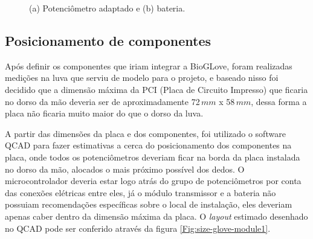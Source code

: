 \documentclass[
	12pt,				%
	openright,			%
	oneside,			%
	a4paper,			%
	english,			%
	brazil				%
	]{abntex2}
\begin{document}
	\begin{figure}[!htb]
		 \centering
		 \caption{ (a) Potenciômetro adaptado e (b) bateria.}
		 \centering
		 \label{Fig:potentiometer-and-battery}
	 \end{figure}


			\subsection{Posicionamento de componentes}

			Após definir os componentes que iriam integrar a BioGLove, foram realizadas medições na luva que serviu de modelo para o projeto, e baseado nisso foi decidido que a dimensão máxima da PCI (Placa de Circuito Impresso) que ficaria no dorso da mão deveria ser de aproximadamente 72$\,mm$ x 58$\,mm$, dessa forma a placa não ficaria muito maior do que o dorso da luva. 
			
			A partir das dimensões da placa e dos componentes, foi utilizado o software QCAD para fazer estimativas a cerca do posicionamento dos componentes na placa, onde todos os potenciômetros deveriam ficar na borda da placa instalada no dorso da mão, alocados o mais próximo possível dos dedos. O microcontrolador deveria estar logo atrás do grupo de potenciômetros por conta das conexões elétricas entre eles, já o módulo transmissor e a bateria não possuiam recomendações específicas sobre o local de instalação, eles deveriam apenas caber dentro da dimensão máxima da placa. O \textit{layout} estimado desenhado no QCAD pode ser conferido através da figura \ref{Fig:size-glove-module1}.
\end{document}
